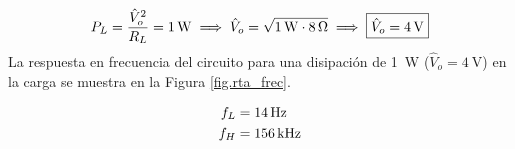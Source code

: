 \begin{equation}
	\centering
	P_L = \frac{ {\hat{V}_o}^{2} }{R_L} = \SI{1}{\watt} \implies \hat{V}_o = \sqrt{\SI{1}{\watt} \cdot \SI{8}{\ohm}} \implies \boxed{\hat{V}_o = \SI{4}{\volt}}
\end{equation}
La respuesta en frecuencia del circuito para una disipación de \SI{1}{\watt} ($\hat{V}_o = \SI{4}{\volt}$) en la carga se muestra en la Figura \ref{fig.rta_frec}.




\begin{align}
	\centering
	f_{L} & = \SI{14}{\hertz}\\
	f_H & = \SI{156}{\kilo\hertz}
\end{align}
